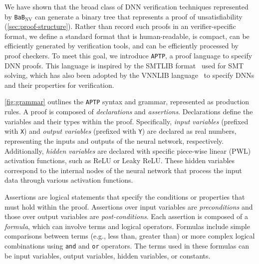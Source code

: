 \documentclass[oneside,11pt,dvipsnames]{book}
\newcommand{\functiontextformat}[1]{\textrm{\texttt{#1}}}
\newcommand{\nnproofformat}{\texttt{APTP}}
\newcommand{\bab}{\texttt{BaB$_{\text{NV}}$}}
\begin{document}
We have shown that the broad class of DNN verification techniques represented by \bab{}
can generate a binary tree that represents a proof of unsatisfiability  (\autoref{sec:proof-structure}). 
Rather than record such proofs in an verifier-specific format, we define a standard format
that is human-readable, is compact, can be efficiently generated by verification tools, and can
be efficiently processed by proof checkers.  
To meet this goal, we introduce \nnproofformat{}, a proof language to specify DNN proofs.
This language is inspired by the SMTLIB format~\cite{barrett2010smt} used for SMT solving, which has also been adopted by the  VNNLIB language~\cite{vnnlib} to specify DNNs and their properties for  verification.


\autoref{fig:grammar} outlines the \nnproofformat{} syntax and grammar, represented as production rules. 
A proof is composed of \textit{declarations} and \textit{assertions}. Declarations define the variables and their types within the proof. Specifically, \textit{input variables} (prefixed with \functiontextformat{X}) and \textit{output variables} (prefixed with \functiontextformat{Y}) are declared as real numbers, representing the inputs and outputs of the neural network, respectively. Additionally, \textit{hidden variables} are declared with specific piece-wise linear (PWL) activation functions, such as ReLU or Leaky ReLU. These hidden variables correspond to the internal nodes of the neural network that process the input data through various activation functions.

Assertions are logical statements that specify the conditions or properties that must hold within the proof. Assertions over input variables are \emph{preconditions} and those over output variables are \emph{post-conditions}. Each assertion is composed of a \textit{formula}, which can involve terms and logical operators. Formulas include simple comparisons between terms (e.g., less than, greater than) or more complex logical combinations using \functiontextformat{and} and \functiontextformat{or} operators. The terms used in these formulas can be input variables, output variables, hidden variables, or constants.
\end{document}
